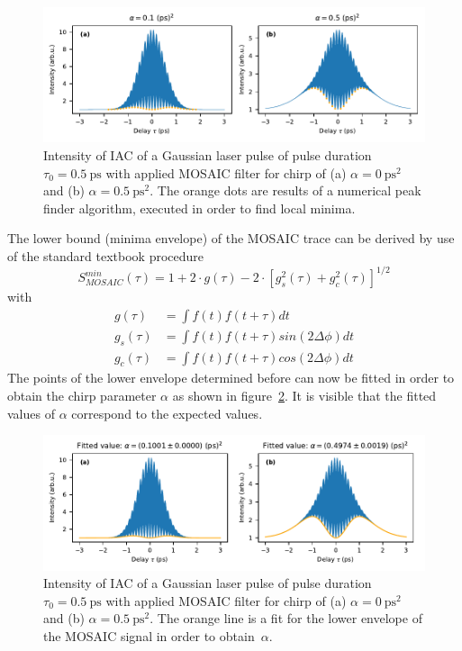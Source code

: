 \begin{figure}[H]
	\centering
	\includegraphics[width=\linewidth]{figures/chirp/plots/mosaic_chirped_laser_pulse_find_envelope}
	\caption{Intensity of IAC of a Gaussian laser pulse of pulse duration $\tau_0=\SI{0.5}{\pico \second}$ with applied MOSAIC filter for chirp of (a) $\alpha = \SI{0}{\pico \second \squared}$ and (b) $\alpha = \SI{0.5}{\pico \second \squared}$.
		The orange dots are results of a numerical peak finder algorithm, executed in order to find local minima.}
	\label{fig:mosaicchirpedlaserpulsefindenvelope}
\end{figure}

The lower bound (minima envelope) of the MOSAIC trace can be derived by use of the standard textbook procedure~\cite{klein_optics_1986}
\begin{equation}
S^{min}_{MOSAIC}(\tau)= 1 + 2 \cdot g(\tau) - 2 \cdot [g_s^2(\tau)+g_c^2(\tau)]^{1/2}
\end{equation}
with
\begin{align}
g(\tau)&=\int f(t)f(t+\tau)dt\\
g_s(\tau)&=\int f(t)f(t+\tau)sin(2\Delta\phi)dt\\
g_c(\tau)&=\int f(t)f(t+\tau)cos(2\Delta\phi)dt
\end{align}
The points of the lower envelope determined before can now be fitted in order to obtain the chirp parameter $\alpha$ as shown in figure~\ref{fig:mosaicchirpedlaserpulsefitenvelope}.
It is visible that the fitted values of $\alpha$ correspond to the expected values.
\begin{figure}[H]
	\centering
	\includegraphics[width=\linewidth]{figures/chirp/plots/mosaic_chirped_laser_pulse_fit_envelope}
	\caption[Intensity of IAC of a Gaussian laser pulse of pulse duration $\tau_0=\SI{0.5}{\pico \second}$ with applied MOSAIC filter and fitted $\alpha$-values.]{Intensity of IAC of a Gaussian laser pulse of pulse duration $\tau_0=\SI{0.5}{\pico \second}$ with applied MOSAIC filter for chirp of (a) $\alpha = \SI{0}{\pico \second \squared}$ and (b) $\alpha = \SI{0.5}{\pico \second \squared}$.
		The orange line is a fit for the lower envelope of the MOSAIC signal in order to obtain~$\alpha$.}
	\label{fig:mosaicchirpedlaserpulsefitenvelope}
\end{figure}

